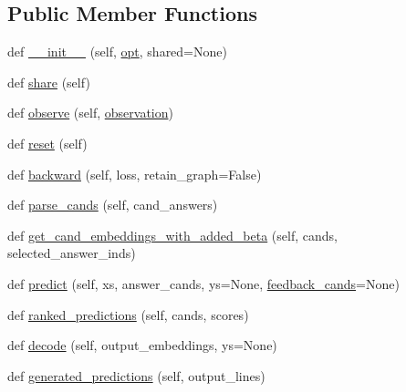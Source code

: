 \subsection*{Public Member Functions}
\begin{DoxyCompactItemize}
\item 
def \hyperlink{classagent_1_1memnn__feedback_1_1MemnnFeedbackAgent_a928894a4f6aa4ccf43c1e6fe2a8babdd}{\+\_\+\+\_\+init\+\_\+\+\_\+} (self, \hyperlink{classagent_1_1memnn__feedback_1_1MemnnFeedbackAgent_a215cfabdb79a192e5dabc0fb3e74e695}{opt}, shared=None)
\item 
def \hyperlink{classagent_1_1memnn__feedback_1_1MemnnFeedbackAgent_a1916ceda9d655dc5b1b2ed2e5d65da4f}{share} (self)
\item 
def \hyperlink{classagent_1_1memnn__feedback_1_1MemnnFeedbackAgent_a79f079fe15142c93348c8a9892b25b27}{observe} (self, \hyperlink{classagent_1_1memnn__feedback_1_1MemnnFeedbackAgent_a1049b4808227afc99e3966614f4b4e6b}{observation})
\item 
def \hyperlink{classagent_1_1memnn__feedback_1_1MemnnFeedbackAgent_adac0929f10a12fb843214fc07df802b3}{reset} (self)
\item 
def \hyperlink{classagent_1_1memnn__feedback_1_1MemnnFeedbackAgent_a694d5215e16fe557e56c1b0ca767e796}{backward} (self, loss, retain\+\_\+graph=False)
\item 
def \hyperlink{classagent_1_1memnn__feedback_1_1MemnnFeedbackAgent_a4012774ea6fbe10c6315f1c010d63f09}{parse\+\_\+cands} (self, cand\+\_\+answers)
\item 
def \hyperlink{classagent_1_1memnn__feedback_1_1MemnnFeedbackAgent_a4f0769934f608795f6d0bd6fa5d19a17}{get\+\_\+cand\+\_\+embeddings\+\_\+with\+\_\+added\+\_\+beta} (self, cands, selected\+\_\+answer\+\_\+inds)
\item 
def \hyperlink{classagent_1_1memnn__feedback_1_1MemnnFeedbackAgent_a5adbaa50b1fb0a4f338912b6983461d6}{predict} (self, xs, answer\+\_\+cands, ys=None, \hyperlink{classagent_1_1memnn__feedback_1_1MemnnFeedbackAgent_afc6ac2b20a83a3b766a5dd985d591277}{feedback\+\_\+cands}=None)
\item 
def \hyperlink{classagent_1_1memnn__feedback_1_1MemnnFeedbackAgent_a279d88f27de78da07c82a315b172f260}{ranked\+\_\+predictions} (self, cands, scores)
\item 
def \hyperlink{classagent_1_1memnn__feedback_1_1MemnnFeedbackAgent_af8ee1bfd956442c04bbc6cba45e4c549}{decode} (self, output\+\_\+embeddings, ys=None)
\item 
def \hyperlink{classagent_1_1memnn__feedback_1_1MemnnFeedbackAgent_a959cbfdba3d83ba7e8571ef999c57601}{generated\+\_\+predictions} (self, output\+\_\+lines)

\end{DoxyCompactItemize}
